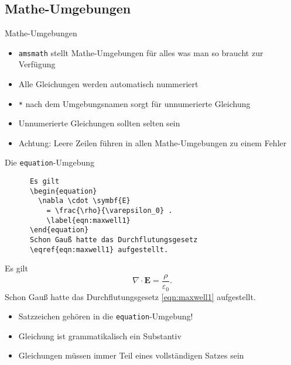 \subsection{Mathe-Umgebungen}

\begin{frame}{
  Mathe-Umgebungen
  \hfill
}
  \begin{itemize}
    \item \texttt{amsmath} stellt Mathe-Umgebungen für alles was man so braucht zur Verfügung
      \item Alle Gleichungen werden automatisch nummeriert
      \item \texttt{*} nach dem Umgebungsnamen sorgt für unnumerierte Gleichung
      \item Unnumerierte Gleichungen sollten selten sein
      \item Achtung: Leere Zeilen führen in allen Mathe-Umgebungen zu einem Fehler
  \end{itemize}
\end{frame}

\begin{frame}[fragile]{Die \texttt{equation}-Umgebung}
  \begin{CodeExample}{0.60}
    \begin{lstlisting}
      Es gilt
      \begin{equation}
        \nabla \cdot \symbf{E}
          = \frac{\rho}{\varepsilon_0} .
          \label{eqn:maxwell1}
      \end{equation}
      Schon Gauß hatte das Durchflutungsgesetz
      \eqref{eqn:maxwell1} aufgestellt.
    \end{lstlisting}
  \CodeResult
  \begin{minipage}[c][8\baselineskip][c]{\textwidth}
      Es gilt
      \begin{equation}
        \nabla \cdot \symbf{E}
          = \frac{\rho}{\varepsilon_0} .
          \label{eqn:maxwell1}
      \end{equation}
      Schon Gauß hatte das Durchflutungsgesetz \eqref{eqn:maxwell1} aufgestellt.
    \end{minipage}
  \end{CodeExample}

  \begin{itemize}
    \item Satzzeichen gehören in die \texttt{equation}-Umgebung!
    \item Gleichung ist grammatikalisch ein Substantiv
    \item Gleichungen müssen immer Teil eines vollständigen Satzes sein
  \end{itemize}
\end{frame}


